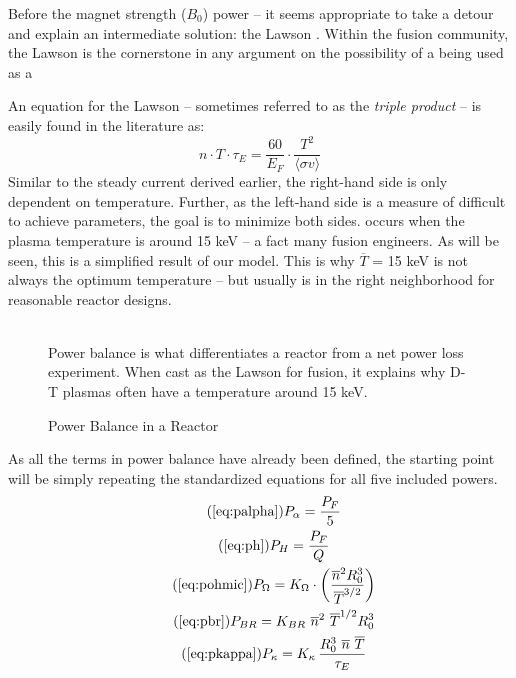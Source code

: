Before  the magnet strength ($B_0$)  power  -- it seems appropriate to take a detour and explain an intermediate solution: the Lawson .\cite{lawson} Within the fusion community, the Lawson  is the cornerstone in any argument on the possibility of a  being used as a 

An equation for the Lawson  -- sometimes referred to as the \emph{triple product} -- is easily found in the literature as:\cite{jeff}
\begin{equation}
	\label{eq:lawson}
	n \cdot T \cdot \tau_E = \frac{ 60 }{ E_F } \cdot \frac{ T ^ 2 }{ \langle \sigma v \rangle }
\end{equation}
Similar to the steady current derived earlier, the right-hand side is only dependent on temperature. Further, as the left-hand side is a measure of difficult to achieve parameters, the goal is to minimize both sides.  occurs when the plasma temperature is around 15 keV -- a fact  many fusion engineers. As will be seen, this is a simplified result of our model. This is why $\overline T$ = 15 keV is not always the optimum temperature -- but usually is in the right neighborhood for reasonable reactor designs.

\begin{figure}
	\centering
	\begin{adjustbox}{width=0.75\textwidth}
		
	\end{adjustbox}
	\caption{Power Balance in a Reactor} ~\\
	\small Power balance is what differentiates a reactor from a net power loss experiment. When cast as the Lawson  for fusion, it explains why D-T plasmas often have a temperature around 15 keV.
	\label{fig:lawson}
\end{figure}

As all the terms in power balance have already been defined, the starting point will be simply repeating the standardized equations for all five included powers.
\begin{gather}
	\tag{\ref{eq:palpha}}
	P_\alpha = \frac{P_F}{5} \\
	\tag{\ref{eq:ph}}
	P_H = \frac{P_F}{Q} \\
	\tag{\ref{eq:pohmic}}
	P_\Omega = K_\Omega \cdot \left( \frac{ \overline n ^ 2 R_0^3 }{\overline T ^ {3/2}} \right) \\
	\tag{\ref{eq:pbr}}
	P_{BR} = K_{BR} \ \overline n ^ 2 \ \overline T ^ {1/2} R_0^3 \\
	\tag{\ref{eq:pkappa}}
	P_\kappa = K_\kappa \, \frac{ R_0 ^ 3 \ \overline{n}  \ \overline{T}  }{\tau_E}
\end{gather}

